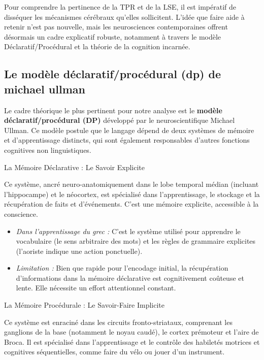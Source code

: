 Pour comprendre la pertinence de la TPR et de la LSE, il est impératif de disséquer les mécanismes
cérébraux qu'elles sollicitent. L'idée que \og faire\fg{} aide à \og retenir\fg{} n'est pas
nouvelle, mais les neurosciences contemporaines offrent désormais un cadre explicatif robuste,
notamment à travers le modèle Déclaratif/Procédural et la théorie de la cognition incarnée.



\subsection{Le modèle déclaratif/procédural (dp) de michael ullman}

Le cadre théorique le plus pertinent pour notre analyse est le \textbf{modèle déclaratif/procédural
(DP)} développé par le neuroscientifique Michael Ullman. Ce modèle postule que le langage dépend de
deux systèmes de mémoire et d'apprentissage distincts, qui sont également responsables d'autres
fonctions cognitives non linguistiques.\cite{III-2-2-ref3}

La Mémoire Déclarative : Le Savoir Explicite

Ce système, ancré neuro-anatomiquement dans le lobe temporal médian (incluant l'hippocampe) et le
néocortex, est spécialisé dans l'apprentissage, le stockage et la récupération de faits et
d'événements. C'est une mémoire explicite, accessible à la conscience.

\begin{itemize}\item \textit{Dans l'apprentissage du grec :} C'est le système utilisé pour apprendre le vocabulaire (le sens arbitraire des mots) et les règles de grammaire explicites (\og l'aoriste indique une action ponctuelle\fg{}).\item \textit{Limitation :} Bien que rapide pour l'encodage initial, la récupération d'informations dans la mémoire déclarative est cognitivement coûteuse et lente. Elle nécessite un effort attentionnel constant.\cite{III-2-2-ref4}\end{itemize}La Mémoire Procédurale : Le Savoir-Faire Implicite

Ce système est enraciné dans les circuits fronto-striataux, comprenant les ganglions de la base
(notamment le noyau caudé), le cortex prémoteur et l'aire de Broca.\cite{III-2-2-ref7} Il est
spécialisé dans l'apprentissage et le contrôle des habiletés motrices et cognitives séquentielles,
comme faire du vélo ou jouer d'un instrument.

